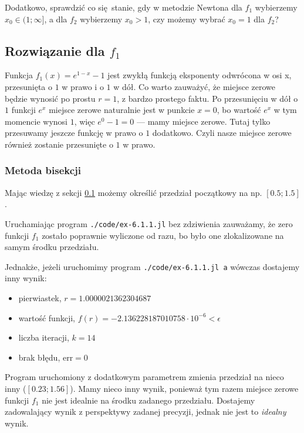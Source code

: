 \documentclass[10pt]{article}
\begin{document}
Dodatkowo, sprawdzić co się stanie, gdy w metodzie Newtona dla $f_1$ wybierzemy $x_0 \in (1; \infty]$, a dla $f_2$ wybierzemy $x_0 > 1$, czy możemy wybrać $x_0 = 1$ dla $f_2$?

\subsection{Rozwiązanie dla $f_1$}\label{6.f_1}

Funkcja $f_1(x) = e^{1-x} -1$ jest zwykłą funkcją eksponenty odwrócona w osi x, przesunięta o $1$ w prawo i o $1$ w dół. Co warto zauważyć, że miejsce zerowe będzie wynosić po prostu $r = 1$, z bardzo prostego faktu. Po przesunięciu w dół o $1$ funkcji $e^x$ miejsce zerowe naturalnie jest w punkcie $x=0$, bo wartość $e^x$ w tym momencie wynosi $1$, więc $e^0 - 1 = 0$ — mamy miejsce zerowe. Tutaj tylko przesuwamy jeszcze funkcję w prawo o $1$ dodatkowo. Czyli nasze miejsce zerowe również zostanie przesunięte o $1$ w prawo.

\subsubsection{Metoda bisekcji}

Mając wiedzę z sekcji \ref{6.f_1} możemy określić przedział początkowy na np. $[0.5; 1.5]$.

Uruchamiając program \texttt{./code/ex-6.1.1.jl} bez zdziwienia zauważamy, że zero funkcji $f_1$ zostało poprawnie wyliczone od razu, bo było one zlokalizowane na samym środku przedziału.

\noindent Jednakże, jeżeli uruchomimy program \texttt{./code/ex-6.1.1.jl a} wówczas dostajemy inny wynik:
\begin{itemize}
    \item pierwiastek, $r = 1.0000021362304687$
    \item wartość funkcji, $f(r) = -2.136228187010758 \cdot 10^{-6} < \epsilon$
    \item liczba iteracji, $k = 14$
    \item brak błędu, $\mathrm{err} = 0$
\end{itemize}

Program uruchomiony z dodatkowym parametrem zmienia przedział na nieco inny ($[0.23; 1.56]$). Mamy nieco inny wynik, ponieważ tym razem miejsce zerowe funkcji $f_1$ nie jest idealnie na środku zadanego przedziału. Dostajemy zadowalający wynik z perspektywy zadanej precyzji, jednak nie jest to \textit{idealny} wynik.
\end{document}
